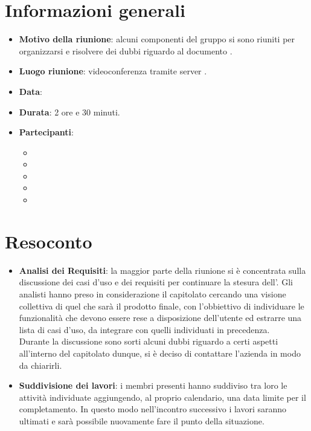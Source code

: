 \section{Informazioni generali}
\begin{itemize}
\item \textbf{Motivo della riunione}: alcuni componenti del gruppo si sono riuniti per organizzarsi e risolvere dei dubbi riguardo al documento \AdR.
\item \textbf{Luogo riunione}: videoconferenza tramite server .
\item \textbf{Data}: \Data{}
\item \textbf{Durata}: 2 ore e 30 minuti.
\item \textbf{Partecipanti}:
	\begin{itemize}
	\item \BM{}
	\item \SG{}
	\item \SP{}
	\item \SH{}
	\item \PA{}
	\end{itemize}
\end{itemize}
\newpage
\section{Resoconto}
\begin{itemize}
\item \textbf{Analisi dei Requisiti}: la maggior parte della riunione si è concentrata sulla discussione dei casi d'uso e dei requisiti per continuare la stesura dell'\AdRv{}.
Gli analisti hanno preso in considerazione il capitolato cercando una visione collettiva di quel che sarà il prodotto finale, con l'obbiettivo di individuare le funzionalità che devono essere rese a disposizione dell'utente ed estrarre una lista di casi d'uso, da integrare con quelli individuati in precedenza. \\
Durante la discussione sono sorti alcuni dubbi riguardo a certi aspetti all'interno del capitolato dunque, si è deciso di contattare l'azienda in modo da chiarirli. 

\item \textbf{Suddivisione dei lavori}: i membri presenti hanno suddiviso tra loro le attività individuate aggiungendo, al proprio calendario, una data limite per il completamento. In questo modo nell'incontro successivo i lavori saranno ultimati e sarà possibile nuovamente fare il punto della situazione.

\end{itemize}

 